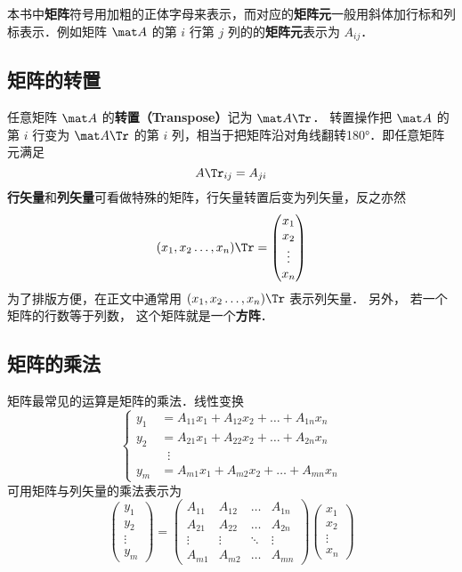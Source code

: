 

本书中\textbf{矩阵}符号用加粗的正体字母来表示，而对应的\textbf{矩阵元}一般用斜体加行标和列标表示．例如矩阵 $\mat A$ 的第 $i$ 行第 $j$ 列的的\textbf{矩阵元}表示为 $A_{ij}$． 

\subsection{矩阵的转置}

任意矩阵 $\mat A$ 的\textbf{转置（Transpose）}记为 $\mat A\Tr$． 转置操作把 $\mat A$ 的第 $i$ 行变为 $\mat A\Tr$ 的第 $i$ 列，相当于把矩阵沿对角线翻转180°．即任意矩阵元满足
\begin{equation}
A\Tr_{ij} = A_{ji}
\end{equation}
\textbf{行矢量}和\textbf{列矢量}可看做特殊的矩阵，行矢量转置后变为列矢量，反之亦然
\begin{equation}
(x_1,x_2 \dots, x_n)\Tr = \begin{pmatrix} x_1\\x_2\\ \vdots\\x_n \end{pmatrix}
\end{equation}
为了排版方便，在正文中通常用 $(x_1,x_2 \dots, x_n)\Tr$ 表示列矢量． 另外， 若一个矩阵的行数等于列数， 这个矩阵就是一个\textbf{方阵}．

\subsection{矩阵的乘法}

矩阵最常见的运算是矩阵的乘法．线性变换
\begin{equation}
\left\{ \begin{split}
y_1 &= A_{11}x_1 + A_{12}x_2 + \ldots + A_{1n}x_n\\
y_2 &= A_{21}x_1 + A_{22}x_2 + \ldots + A_{2n}x_n\\
&\;\;\vdots \\
y_m &= A_{m1}x_1 + A_{m2}x_2 + \ldots + A_{mn}x_n
\end{split} \right.
\end{equation}
可用矩阵与列矢量的乘法表示为
\begin{equation}
\begin{pmatrix} y_1 \\ y_2\\ \vdots \\ y_m \end{pmatrix}
= \begin{pmatrix}
A_{11}  & A_{12} & \ldots & A_{1n} \\
A_{21}  & A_{22} & \ldots & A_{2n} \\
 \vdots & \vdots  & \ddots & \vdots \\
A_{m1}  & A_{m2} & \ldots & A_{mn}
\end{pmatrix}
\begin{pmatrix} x_1 \\ x_2 \\ \vdots \\ x_n \end{pmatrix}
\end{equation}

